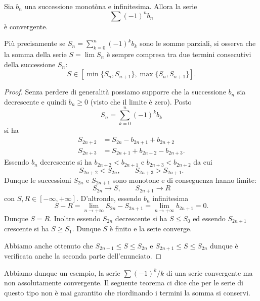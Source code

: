 \begin{theorem}
\label{th:Leibniz}%
\mymark{***}%
%
%
%
%
Sia $b_n$ una successione monotòna e infinitesima. Allora
la serie
\[
  \sum (-1)^{n} b_n
\]
è convergente.

Più precisamente se $\displaystyle S_n = \sum_{k=0}^n (-1)^k b_k$
sono le somme parziali,
si osserva che la somma della serie $S= \lim S_n$ è sempre compresa
tra due termini consecutivi della successione $S_n$:
\[
  S \in [\min\{S_n, S_{n+1}\}, \max\{S_n, S_{n+1}\}].
\]
\end{theorem}
%
\begin{proof}
\mymark{***}
Senza perdere di generalità possiamo supporre che la successione $b_n$ sia decrescente e quindi $b_n \ge 0$ (visto che il limite è zero).
Posto
\[
 S_n = \sum_{k=0}^n (-1)^k b_k
\]
si ha
\begin{align*}
  S_{2n+2} &= S_{2n} - b_{2n+1} + b_{2n+2} \\
  S_{2n+3} &= S_{2n+1} + b_{2n+2} - b_{2n+3}.
\end{align*}
Essendo $b_n$ decrescente si ha $b_{2n+2} < b_{2n+1}$ e $b_{2n+3} < b_{2n+2}$ da cui
\[
  S_{2n+2} < S_{2n}, \qquad S_{2n+3} > S_{2n+1}.
\]
Dunque le successioni $S_{2n}$ e $S_{2n+1}$ sono monotone e di conseguenza
hanno limite:
\[
  S_{2n} \to S, \qquad S_{2n+1} \to R
\]
con $S, R  \in [-\infty, +\infty]$.
D'altronde, essendo $b_n$ infinitesima
\[
  S - R
  = \lim_{n\to +\infty} S_{2n} - S_{2n+1}
  = \lim_{n\to +\infty} b_{2n+1} = 0.
\]
Dunque $S=R$. Inoltre essendo $S_{2n}$ decrescente si ha
$S \le S_0$ ed essendo $S_{2n+1}$ crescente si ha $S\ge S_1$.
Dunque $S$ è finito e la serie converge.

Abbiamo anche ottenuto che
$S_{2n-1} \le S \le S_{2n}$ e $S_{2n+1} \le S \le S_{2n}$
dunque è verificata anche la seconda parte dell'enunciato.
\end{proof}

Abbiamo dunque un esempio, la serie $\sum (-1)^k / k$ di una serie convergente ma non assolutamente convergente.
Il seguente teorema ci dice che per le serie di questo tipo non è mai garantito che riordinando i termini la somma si conservi.


